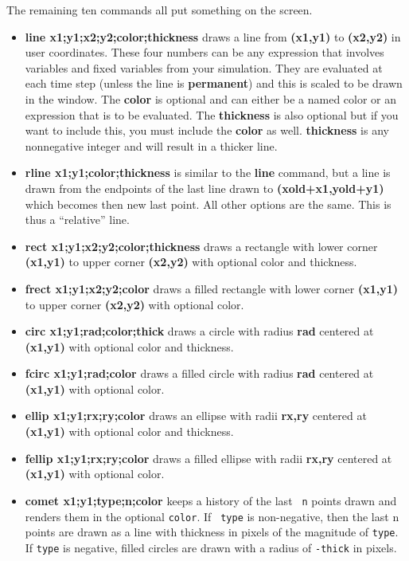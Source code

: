 \documentclass{article}
\begin{document}
The remaining ten commands all put something on the screen. 
\begin{itemize}

\item {\bf line x1;y1;x2;y2;color;thickness }  draws a line from {\bf (x1,y1)} 
to {\bf (x2,y2)} in user coordinates.  These four numbers can be any
expression that involves variables and fixed variables from your
simulation. They are evaluated at each time step (unless the line is
{\bf permanent}) and this is scaled to be drawn in the window.  The
{\bf color} is optional and can either be a named color or an
expression that is to be evaluated. The {\bf thickness} is also
optional but if you want to include this, you must include the {\bf
color} as well. {\bf thickness} is any nonnegative integer and will
result in a thicker line. 

\item {\bf rline x1;y1;color;thickness } is similar to the {\bf line}
command, but a line is drawn from the endpoints of the last line drawn
to {\bf (xold+x1,yold+y1)} which becomes then new last point. All other options
are the same. This is thus a ``relative'' line.

\item {\bf rect x1;y1;x2;y2;color;thickness } draws a rectangle with
lower corner {\bf (x1,y1)} to upper corner {\bf (x2,y2)} with optional
color and thickness. 

\item {\bf frect x1;y1;x2;y2;color } draws a filled rectangle with
lower corner {\bf (x1,y1)} to upper corner {\bf (x2,y2)} with optional
color. 

\item {\bf circ x1;y1;rad;color;thick } draws a circle with radius {\bf rad}
centered at {\bf (x1,y1)} with optional
color and thickness.

\item {\bf fcirc x1;y1;rad;color } draws a filled circle with radius {\bf rad}
centered at {\bf (x1,y1)} with optional color.

\item {\bf ellip x1;y1;rx;ry;color } draws an ellipse with radii {\bf rx,ry}
centered at {\bf (x1,y1)} with optional
color and thickness. 

\item {\bf fellip x1;y1;rx;ry;color } draws a filled ellipse with
radii {\bf rx,ry}  centered at {\bf (x1,y1)} with optional
color. 

\item {\bf comet x1;y1;type;n;color} keeps a history of the last {\tt
n} points drawn and renders them in the optional {\tt color}. If {\tt
type} is non-negative, then the last n points are drawn as a line with
thickness in pixels of the magnitude of {\tt type}.  If {\tt type} is
negative, filled circles are drawn with a radius of {\tt -thick} in
pixels.


\end{itemize}
\end{document}
